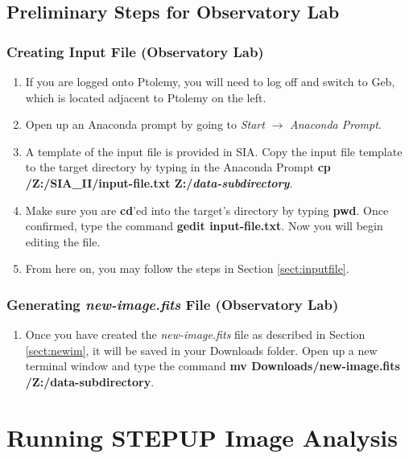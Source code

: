\documentclass[11pt]{report}
\begin{document}
\section{Preliminary Steps for Observatory Lab}
\subsection{Creating Input File (Observatory Lab)}
\begin{enumerate}
\item If you are logged onto Ptolemy, you will need to log off and switch to Geb, which is located adjacent to Ptolemy on the left.
\item Open up an Anaconda prompt by going to \emph{Start} $\rightarrow$ \emph{Anaconda Prompt}.
\item A template of the input file is provided in SIA. Copy the input file template to the target directory by typing in the Anaconda Prompt {\bf cp /Z:/SIA\_II/input-file.txt Z:/\emph{data-subdirectory}}.
\item Make sure you are {\bf cd}'ed into the target's directory by typing \textbf{pwd}. Once confirmed, type the command {\bf gedit input-file.txt}. Now you will begin editing the file.
\item From here on, you may follow the steps in Section \ref{sect:inputfile}.
\end{enumerate}

\subsection{Generating \emph{new-image.fits} File (Observatory Lab)}
\begin{enumerate}
\item Once you have created the \emph{new-image.fits} file as described in Section \ref{sect:newim}, it will be saved in your Downloads folder. Open up a new terminal window and type the command {\bf mv Downloads/new-image.fits /Z:/data-subdirectory}.
\end{enumerate}

\chapter{Running STEPUP Image Analysis}
\end{document}

